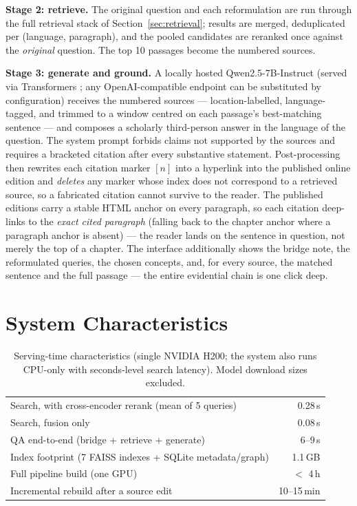 \documentclass[11pt,a4paper]{article}
\begin{document}
\textbf{Stage 2: retrieve.} The original question and each reformulation
are run through the full retrieval stack of
Section~\ref{sec:retrieval}; results are merged, deduplicated per
(language, paragraph), and the pooled candidates are reranked once
against the \emph{original} question. The top 10 passages become the
numbered sources.

\textbf{Stage 3: generate and ground.} A locally hosted
Qwen2.5-7B-Instruct \cite{qwen25} (served via Transformers
\cite{wolf2020transformers}; any OpenAI-compatible endpoint can be
substituted by configuration) receives the numbered sources ---
location-labelled, language-tagged, and trimmed to a window centred on
each passage's best-matching sentence --- and composes a scholarly
third-person answer in the language of the question. The system prompt
forbids claims not supported by the sources and requires a bracketed
citation after every substantive statement. Post-processing then rewrites
each citation marker $[n]$ into a hyperlink into the published online
edition and \emph{deletes} any marker whose index does not correspond to a
retrieved source, so a fabricated citation cannot survive to the reader.
The published editions carry a stable HTML anchor on every paragraph, so
each citation deep-links to the \emph{exact cited paragraph} (falling back
to the chapter anchor where a paragraph anchor is absent) --- the reader
lands on the sentence in question, not merely the top of a chapter. The
interface additionally shows the bridge note,
the reformulated queries, the chosen concepts, and, for every source, the
matched sentence and the full passage --- the entire evidential chain is
one click deep.

\section{System Characteristics}
\label{sec:stats}

\begin{table}[t]
\centering
\caption{Serving-time characteristics (single NVIDIA H200; the system
also runs CPU-only with seconds-level search latency). Model download
sizes excluded.}
\label{tab:perf}
\begin{tabular}{lr}
\toprule
Search, with cross-encoder rerank (mean of 5 queries) & 0.28\,s\\
Search, fusion only & 0.08\,s\\
QA end-to-end (bridge + retrieve + generate) & 6--9\,s\\
Index footprint (7 FAISS indexes + SQLite metadata/graph) & 1.1\,GB\\
Full pipeline build (one GPU) & $<$ 4\,h\\
Incremental rebuild after a source edit & 10--15\,min\\
\bottomrule
\end{tabular}
\end{table}
\end{document}
